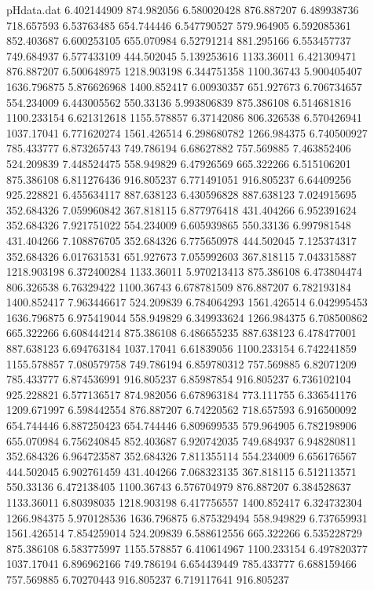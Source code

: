 \begin{filecontents}{pHdata.dat}
6.402144909	874.982056
6.580020428	876.887207
6.489938736	718.657593
6.53763485	654.744446
6.547790527	579.964905
6.592085361	852.403687
6.600253105	655.070984
6.52791214	881.295166
6.553457737	749.684937
6.577433109	444.502045
5.139253616	1133.36011
6.421309471	876.887207
6.500648975	1218.903198
6.344751358	1100.36743
5.900405407	1636.796875
5.876626968	1400.852417
6.00930357	651.927673
6.706734657	554.234009
6.443005562	550.33136
5.993806839	875.386108
6.514681816	1100.233154
6.621312618	1155.578857
6.37142086	806.326538
6.570426941	1037.17041
6.771620274	1561.426514
6.298680782	1266.984375
6.740500927	785.433777
6.873265743	749.786194
6.68627882	757.569885
7.463852406	524.209839
7.448524475	558.949829
6.47926569	665.322266
6.515106201	875.386108
6.811276436	916.805237
6.771491051	916.805237
6.64409256	925.228821
6.455634117	887.638123
6.430596828	887.638123
7.024915695	352.684326
7.059960842	367.818115
6.877976418	431.404266
6.952391624	352.684326
7.921751022	554.234009
6.605939865	550.33136
6.997981548	431.404266
7.108876705	352.684326
6.775650978	444.502045
7.125374317	352.684326
6.017631531	651.927673
7.055992603	367.818115
7.043315887	1218.903198
6.372400284	1133.36011
5.970213413	875.386108
6.473804474	806.326538
6.76329422	1100.36743
6.678781509	876.887207
6.782193184	1400.852417
7.963446617	524.209839
6.784064293	1561.426514
6.042995453	1636.796875
6.975419044	558.949829
6.349933624	1266.984375
6.708500862	665.322266
6.608444214	875.386108
6.486655235	887.638123
6.478477001	887.638123
6.694763184	1037.17041
6.61839056	1100.233154
6.742241859	1155.578857
7.080579758	749.786194
6.859780312	757.569885
6.82071209	785.433777
6.874536991	916.805237
6.85987854	916.805237
6.736102104	925.228821
6.577136517	874.982056
6.678963184	773.111755
6.336541176	1209.671997
6.598442554	876.887207
6.74220562	718.657593
6.916500092	654.744446
6.887250423	654.744446
6.809699535	579.964905
6.782198906	655.070984
6.756240845	852.403687
6.920742035	749.684937
6.948280811	352.684326
6.964723587	352.684326
7.811355114	554.234009
6.656176567	444.502045
6.902761459	431.404266
7.068323135	367.818115
6.512113571	550.33136
6.472138405	1100.36743
6.576704979	876.887207
6.384528637	1133.36011
6.80398035	1218.903198
6.417756557	1400.852417
6.324732304	1266.984375
5.970128536	1636.796875
6.875329494	558.949829
6.737659931	1561.426514
7.854259014	524.209839
6.588612556	665.322266
6.535228729	875.386108
6.583775997	1155.578857
6.410614967	1100.233154
6.497820377	1037.17041
6.896962166	749.786194
6.654439449	785.433777
6.688159466	757.569885
6.70270443	916.805237
6.719117641	916.805237

\end{filecontents}
